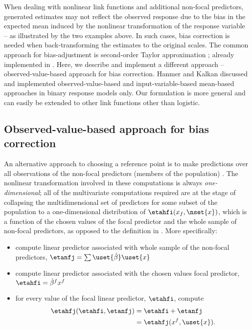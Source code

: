 When dealing with nonlinear link functions and additional non-focal predictors,  generated estimates may not reflect the observed response due to the bias in the expected mean induced by the nonlinear transformation of the response variable -- as illustrated by the two examples above. In such cases, bias correction is needed when back-transforming the estimates to the original scales. The common approach for bias-adjustment is second-order Taylor approximation \citep{duursma2003bias, hanmer2013behind}; already implemented in  \citep{lenth2018package}. Here, we describe and implement a different approach -- observed-value-based approach for bias correction. Hanmer and Kalkan \citep{hanmer2013behind} discussed and implemented observed-value-based and input-variable-based mean-based approaches in binary response models only. Our formulation is more general and can easily be extended to other link functions other than logistic. 


\subsection{Observed-value-based approach for bias correction}

An alternative approach to choosing a reference point is to make predictions over all observations of the non-focal predictors (members of the population) \citep{hanmer2013behind}. The nonlinear transformation involved in these computations is always \emph{one-dimensional}; all of the multivariate computations required are at the stage of collapsing the multidimensional set of predictors for some subset of the population to a one-dimensional distribution of $\etahfi(x_f, \nset{x})$, which is a function of the chosen values of the focal predictor and the whole sample of non-focal predictors, as opposed to the definition in . More specifically:
\begin{itemize}
\item compute linear predictor associated with whole sample of the non-focal predictors, $\etanfj = \sum \uset{\hat{\beta}} \uset{x}$
\item compute linear predictor associated with the chosen values focal predictor, $\etahfi = \hat{\beta}^f x^f$
\item for every value of the focal linear predictor, $\etahfi$, compute
%
\begin{align}\label{eq:pop_eta} 
\etahfj(\etahfi, \etanfj)  &= \etahfi + \etanfj \nonumber \\
&= \etahfj(x^f, \uset{x}).
\end{align}
\end{itemize}
%

